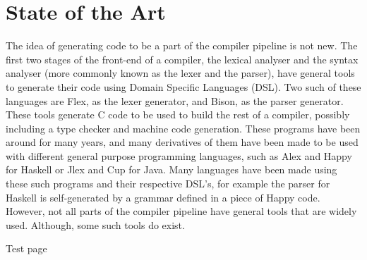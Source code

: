 \chapter{State of the Art}

The idea of generating code to be a part of the compiler pipeline is not new.
The first two stages of the front-end of a compiler, the lexical analyser and the syntax analyser (more commonly known as the lexer and the parser), have general tools to generate their code using Domain Specific Languages (DSL)\cite{Bentley:1986:PPL:6424.315691,van2000domain}.
Two such of these languages are Flex\cite{Levine:2009:FB:1696439}, as the lexer generator, and Bison\cite{Levine:2009:FB:1696439}, as the parser generator.
These tools generate C code to be used to build the rest of a compiler, possibly including a type checker and machine code generation.
These programs have been around for many years, and many derivatives of them have been made to be used with different general purpose programming languages, such as Alex and Happy for Haskell or Jlex and Cup for Java\cite{ranta2012implementing}.
Many languages have been made using these such programs and their respective DSL's, for example the parser for Haskell is self-generated by a grammar defined in a piece of Happy code.
However, not all parts of the compiler pipeline have general tools that are widely used.
Although, some such tools do exist\cite{grimm2007typical,ruler}.

%


\pagebreak
Test page
